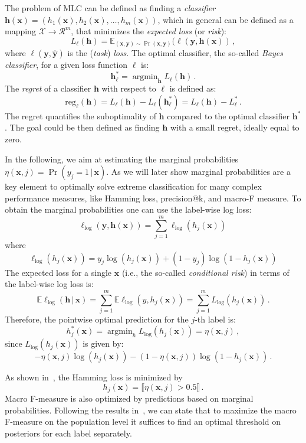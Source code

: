 \documentclass{article}
\renewcommand{\vec}[1]{\boldsymbol{#1}}
\newcommand{\bx}{\vec{x}}
\newcommand{\by}{\vec{y}}
\newcommand{\bh}{\vec{h}}
\newcommand{\calX}{\mathcal{X}}
\newcommand{\calR}{\mathcal{R}}
\newcommand{\reg}{\mathrm{reg}}
\newcommand{\loss}{L}
\newcommand{\assert}[1]{\llbracket #1 \rrbracket}
\newcommand{\given}{\, | \,}
\DeclareMathOperator*{\argmin}{\arg \min}
\begin{document}
The problem of MLC can be defined as finding a  \emph{classifier} $\bh(\bx) = (h_1(\bx), h_2(\bx),\ldots, h_m(\bx))$, 
which in general can be defined as a mapping $\calX \rightarrow \calR^m$, that minimizes the \emph{expected loss} (or \emph{risk}):  
$$
\loss_\ell(\bh) = \mathbb{E}_{(\bx,\by) \sim \Pr(\bx,\by)} (\ell(\by, \bh(\bx))\,,
$$
where $\ell(\by, \hat{\by})$ is the  (\emph{task}) \emph{loss}.
%
The optimal classifier,  the so-called \emph{Bayes classifier},  for a given loss function $\ell$ is:
$$
\bh^*_\ell = \argmin_{\bh}  \loss_\ell(\bh) \,.
$$
The \emph{regret} of a classifier $\bh$ with respect to $\ell$ is defined as:
 $$
\reg_\ell(\bh) = \loss_\ell(\bh) - \loss_\ell(\bh_{\ell}^*) = \loss_\ell(\bh) - \loss_\ell^* \,.
$$
The regret quantifies the suboptimality of $\bh$ compared to the optimal classifier $\bh^*$. The goal could be then defined as finding $\bh$ with a small regret, ideally equal to zero.

In the following, we aim at estimating the marginal probabilities $\eta(\bx,j) = \Pr(y_j = 1 \given \bx)$. As we will later show marginal probabilities are a key element to optimally solve extreme classification for many complex performance measures, like Hamming loss, precision@k, and macro-F measure. 
To obtain the marginal probabilities one can use the label-wise log loss:
$$
\ell_{\log}(\by, \bh(\bx))  = \sum_{j=1}^m \ell_{\log}(h_j(\bx)) \,
$$
where 
$$
\ell_{\log}(h_j(\bx)) = y_j \log(h_j(\bx)) + (1-y_j) \log(1-h_j(\bx)) 
$$
The expected loss for a single $\bx$ (i.e., the so-called \emph{conditional risk}) in terms of the label-wise log loss is:
$$
\mathbb{E} \ell_{\log}(\bh \given \bx) =  \sum_{j=1}^m \mathbb{E}{\ell_{\log}(y, h_j(\bx))} = \sum_{j=1}^m \loss_{\log}(h_j(\bx))\,. %
$$
Therefore, the pointwise optimal prediction for the $j$-th label is:
$$
 h_j^*(\bx)  = \argmin_h \loss_{\log}(h_j(\bx)) = \eta(\bx, j) \,,
$$
since $\loss_{\log}(h_j(\bx))$ is given by:
$$
-\eta(\bx,j) \log(h_j(\bx)) - (1-\eta(\bx,j) ) \log(1 \!-\! h_j(\bx)) \,.
$$

As shown in~\citep{Dembczynski_et_al_2010c}, the Hamming loss is minimized by 
$$
h_j(\bx) = \assert{\eta(\bx,j) > 0.5} \,.
$$
Macro F-measure is also optimized by predictions based on marginal probabilities. Following the results in~\citep{Ye_et_al_2012,Narasimhan_et_al_2014,Jasinska_et_al_2016, Dembczynski_et_al_2017}, we can state that to maximize the macro F-measure on the population level it suffices to find an optimal threshold on posteriors for each label separately. 
\end{document}
